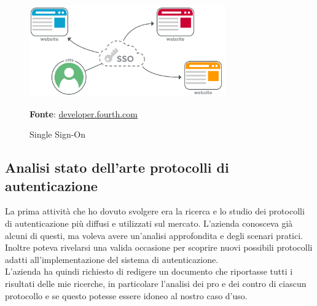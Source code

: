     \begin{figure}[h]
        \centering
        \includegraphics[width=0.75\textwidth]{immagini/sso.png}
        \caption{Single Sign-On}
        \textbf{Fonte}:
        \href{https://developer.fourth.com/en-gb/docs/single-sign-saml}{developer.fourth.com}
        \label{fig: Single Sign-On}
    \end{figure}

\newpage

    \subsection{Analisi stato dell'arte protocolli di autenticazione}\label{sec:att_analisi}
    La prima attività che ho dovuto svolgere era la ricerca e lo studio dei protocolli di autenticazione più diffusi e utilizzati sul mercato. L'azienda conosceva già alcuni di questi, ma voleva avere un'analisi approfondita e degli scenari pratici. Inoltre poteva rivelarsi una valida occasione per scoprire nuovi possibili protocolli adatti all'implementazione del sistema di autenticazione. \\
    L'azienda ha quindi richiesto di redigere un documento che riportasse tutti i risultati delle mie ricerche, in particolare l'analisi dei pro e dei contro di ciascun protocollo e se questo potesse essere idoneo al nostro caso d'uso.

